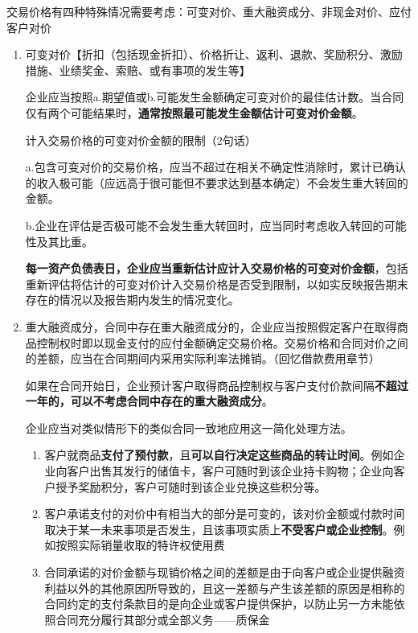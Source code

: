 \documentclass[UTF8,12pt]{ctexart}
\numberwithin{equation}{section} %
\numberwithin{figure}{section}
\numberwithin{table}{section}
\begin{document}
	交易价格有四种特殊情况需要考虑：可变对价、重大融资成分、非现金对价、应付客户对价
	\begin{enumerate}
		\item 可变对价【折扣（包括现金折扣）、价格折让、返利、退款、奖励积分、激励措施、业绩奖金、索赔、或有事项的发生等】
		
		企业应当按照a.期望值或b.可能发生金额确定可变对价的最佳估计数。当合同仅有两个可能结果时，\textbf{通常按照最可能发生金额估计可变对价金额}。
		
		计入交易价格的可变对价金额的限制（2句话）
		
		a.包含可变对价的交易价格，应当不超过在相关不确定性消除时，累计已确认的收入极可能（应远高于很可能但不要求达到基本确定）不会发生重大转回的金额。
		
		b.企业在评估是否极可能不会发生重大转回时，应当同时考虑收入转回的可能性及其比重。
		
		\textbf{每一资产负债表日，企业应当重新估计应计入交易价格的可变对价金额}，包括重新评估将估计的可变对价计入交易价格是否受到限制，以如实反映报告期末存在的情况以及报告期内发生的情况变化。
		
		
		\item 重大融资成分，合同中存在重大融资成分的，企业应当按照假定客户在取得商品控制权时即以现金支付的应付金额确定交易价格。交易价格和合同对价之间的差额，应当在合同期间内采用实际利率法摊销。（回忆借款费用章节）
		
		如果在合同开始日，企业预计客户取得商品控制权与客户支付价款间隔\textbf{不超过一年的，可以不考虑合同中存在的重大融资成分}。
		
		企业应当对类似情形下的类似合同一致地应用这一简化处理方法。
		\begin{enumerate}
			\item 客户就商品\textbf{支付了预付款}，且\textbf{可以自行决定这些商品的转让时间}。例如企业向客户出售其发行的储值卡，客户可随时到该企业持卡购物；企业向客户授予奖励积分，客户可随时到该企业兑换这些积分等。
			
			\item 客户承诺支付的对价中有相当大的部分是可变的，该对价金额或付款时间取决于某一未来事项是否发生，且该事项实质上\textbf{不受客户或企业控制}。例如按照实际销量收取的特许权使用费
			
			\item 合同承诺的对价金额与现销价格之间的差额是由于向客户或企业提供融资利益以外的其他原因所导致的，且这一差额与产生该差额的原因是相称的合同约定的支付条款目的是向企业或客户提供保护，以防止另一方未能依照合同充分履行其部分或全部义务——质保金
			

\end{enumerate}
\end{enumerate}
\end{document}
